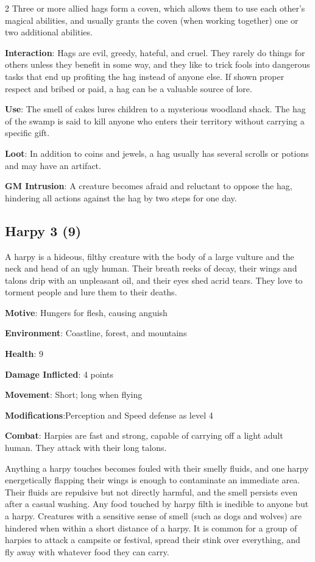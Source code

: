 \begin{multicols}{2}
Three or more allied hags form a coven, which allows them to use each other’s magical abilities, and usually grants the coven (when working together) one or two additional abilities. 

\textbf{Interaction}: Hags are evil, greedy, hateful, and cruel. They rarely do things for others unless they benefit in some way, and they like to trick fools into dangerous tasks that end up profiting the hag instead of anyone else. If shown proper respect and bribed or paid, a hag can be a valuable source of lore. 

\textbf{Use}: The smell of cakes lures children to a mysterious woodland shack. The hag of the swamp is said to kill anyone who enters their territory without carrying a specific gift. 

\textbf{Loot}: In addition to coins and jewels, a hag usually has several scrolls or potions and may have an artifact.

\textbf{GM Intrusion}: A creature becomes afraid and reluctant to oppose the hag, hindering all actions against the hag by two steps for one day.

\subsection{Harpy 3 (9)}

A harpy is a hideous, filthy creature with the body of a large vulture and the neck and head of an ugly human. Their breath reeks of decay, their wings and talons drip with an unpleasant oil, and their eyes shed acrid tears. They love to torment people and lure them to their deaths. 

\textbf{Motive}: Hungers for flesh, causing anguish 

\textbf{Environment}: Coastline, forest, and mountains 

\textbf{Health}: 9 

\textbf{Damage Inflicted}: 4 points 

\textbf{Movement}: Short; long when flying 

\textbf{Modifications}:Perception and Speed defense as level 4 

\textbf{Combat}: Harpies are fast and strong, capable of carrying off a light adult human. They attack with their long talons. 

Anything a harpy touches becomes fouled with their smelly fluids, and one harpy energetically flapping their wings is enough to contaminate an immediate area. Their fluids are repulsive but not directly harmful, and the smell persists even after a casual washing. Any food touched by harpy filth is inedible to anyone but a harpy. Creatures with a sensitive sense of smell (such as dogs and wolves) are hindered when within a short distance of a harpy. It is common for a group of harpies to attack a campsite or festival, spread their stink over everything, and fly away with whatever food they can carry.


\end{multicols}
